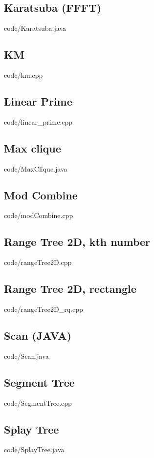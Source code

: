 \documentclass [landscape,10pt,a4paper,twocolumn,nofonts]{article}
\begin{document}
\subsection{Karatsuba (FFFT)}
 {code/Karatsuba.java}
\subsection{KM}
 {code/km.cpp}
\subsection{Linear Prime}
 {code/linear_prime.cpp}
\subsection{Max clique}
 {code/MaxClique.java}
\subsection{Mod Combine}
 {code/modCombine.cpp}
\subsection{Range Tree 2D, kth number}
 {code/rangeTree2D.cpp}
\subsection{Range Tree 2D, rectangle}
 {code/rangeTree2D_rq.cpp}
\subsection{Scan (JAVA)}
 {code/Scan.java}
\subsection{Segment Tree}
 {code/SegmentTree.cpp}
\subsection{Splay Tree}
 {code/SplayTree.java}
\end{document}
